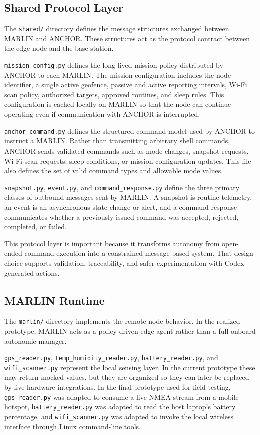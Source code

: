 \documentclass[journal]{IEEEtran}
\begin{document}
\subsection{Shared Protocol Layer}
The \texttt{shared/} directory defines the message structures exchanged between MARLIN and ANCHOR. These structures act as the protocol contract between the edge node and the base station.

\texttt{mission\_config.py} defines the long-lived mission policy distributed by ANCHOR to each MARLIN. The mission configuration includes the node identifier, a single active geofence, passive and active reporting intervals, Wi-Fi scan policy, authorized targets, approved routines, and sleep rules. This configuration is cached locally on MARLIN so that the node can continue operating even if communication with ANCHOR is interrupted.

\texttt{anchor\_command.py} defines the structured command model used by ANCHOR to instruct a MARLIN. Rather than transmitting arbitrary shell commands, ANCHOR sends validated commands such as mode changes, snapshot requests, Wi-Fi scan requests, sleep conditions, or mission configuration updates. This file also defines the set of valid command types and allowable mode values.

\texttt{snapshot.py}, \texttt{event.py}, and \texttt{command\_response.py} define the three primary classes of outbound messages sent by MARLIN. A snapshot is routine telemetry, an event is an asynchronous state change or alert, and a command response communicates whether a previously issued command was accepted, rejected, completed, or failed.

This protocol layer is important because it transforms autonomy from open-ended command execution into a constrained message-based system. That design choice supports validation, traceability, and safer experimentation with Codex-generated actions.

\subsection{MARLIN Runtime}
The \texttt{marlin/} directory implements the remote node behavior. In the realized prototype, MARLIN acts as a policy-driven edge agent rather than a full onboard autonomic manager.

\texttt{gps\_reader.py}, \texttt{temp\_humidity\_reader.py}, \texttt{battery\_reader.py}, and \texttt{wifi\_scanner.py} represent the local sensing layer. In the current prototype these may return mocked values, but they are organized so they can later be replaced by live hardware integrations. In the final prototype used for field testing, \texttt{gps\_reader.py} was adapted to consume a live NMEA stream from a mobile hotspot, \texttt{battery\_reader.py} was adapted to read the host laptop's battery percentage, and \texttt{wifi\_scanner.py} was adapted to invoke the local wireless interface through Linux command-line tools.
\end{document}
